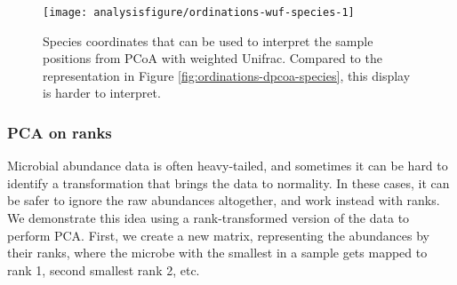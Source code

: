 \begin{figure}
\begin{knitrout}
\color{fgcolor}\begin{kframe}
\begin{alltt}
  \hlstd{=} \hlstd{,}  \hlstd{=} \hlstd{)} \hlopt{+}
  \hlstd{(}\hlstd{(evals[}\hlstd{]} \hlopt{/} \hlstd{evals[}\hlstd{]))}
\end{alltt}
\end{kframe}

{\centering \texttt{[image: analysisfigure/ordinations-wuf-species-1]} 

}



\end{knitrout}
\caption{Species coordinates that can be used to interpret the sample
  positions from PCoA with weighted Unifrac. Compared to the
  representation in Figure \ref{fig:ordinations-dpcoa-species}, this
  display is harder to interpret.}
\label{fig:ordinations-wuf-species}
\end{figure}

\subsubsection*{PCA on ranks}

Microbial abundance data is often heavy-tailed, and sometimes it can
be hard to identify a transformation that brings the data to
normality. In these cases, it can be safer to ignore the raw
abundances altogether, and work instead with ranks. We demonstrate
this idea using a rank-transformed version of the data to perform
PCA. First, we create a new matrix, representing the abundances by
their ranks, where the microbe with the smallest in a sample gets
mapped to rank 1, second smallest rank 2, etc.

\begin{knitrout}
\color{fgcolor}\begin{kframe}
\begin{alltt}
 \hlkwb{<-} 
 \hlkwb{<-} \hlstd{(} 
\end{alltt}
\end{kframe}
\end{knitrout}

